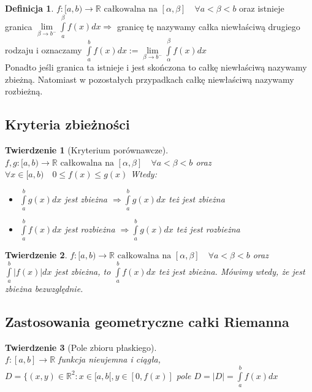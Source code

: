 \documentclass[12pt,a4paper]{article}
\newtheorem{tw}{Twierdzenie}
\theoremstyle{definition}
\newtheorem{df}{Definicja}
\begin{document}
\begin{df}
$f: [a, b) \to \mathbb{R} \text{ całkowalna na } [\alpha, \beta] \quad \forall a < \beta < b$ oraz istnieje granica $\lim\limits_{\beta\to b^-} \int\limits_a^\beta f(x)dx \Rightarrow$ granicę tę nazywamy całka niewłaściwą drugiego rodzaju i oznaczamy $\int\limits_a^b f(x)dx := \lim\limits_{\beta\to b^-} \int\limits_\alpha^\beta f(x)dx$\\
Ponadto jeśli granica ta istnieje i jest skończona to całkę niewłaściwą nazywamy zbieżną. Natomiast w pozostałych przypadkach całkę niewłaściwą nazywamy rozbieżną.
\end{df}

\subsection{Kryteria zbieżności}

\begin{tw}[Kryterium porównawcze]~\\
$f,g: [a,b) \to \mathbb{R} \text{ całkowalna na } [\alpha, \beta] \quad \forall a < \beta < b$ oraz
$\forall x\in [a,b) \quad 0 \leqslant f(x) \leq g(x)$ Wtedy:
\begin{itemize}
\item $\int\limits_a^bg(x)dx$ jest zbieżna $\Rightarrow \int\limits_a^bg(x)dx$ też jest zbieżna
\item $\int\limits_a^bf(x)dx$ jest rozbieżna $\Rightarrow \int\limits_a^bg(x)dx$ też jest rozbieżna
\end{itemize}
\end{tw}

\begin{tw}
$f: [a,b) \to \mathbb{R} \text{ całkowalna na } [\alpha, \beta] \quad \forall a < \beta < b$ oraz
$\int\limits_a^b |f(x)|dx$ jest zbieżna, to $\int\limits_a^b f(x)dx$ też jest zbieżna. Mówimy wtedy, że jest zbieżna bezwzględnie.
\end{tw} 

\subsection{Zastosowania geometryczne całki Riemanna}

\begin{tw}[Pole zbioru płaskiego]~\\
$f: [a,b] \to \mathbb{R}$ funkcja nieujemna i ciągła, $D = \{(x,y) \in \mathbb{R}^2: x\in [a,b[, y\in [0, f(x)]$
pole $D = |D| = \int\limits_a^b f(x)dx$
\end{tw}
\end{document}
